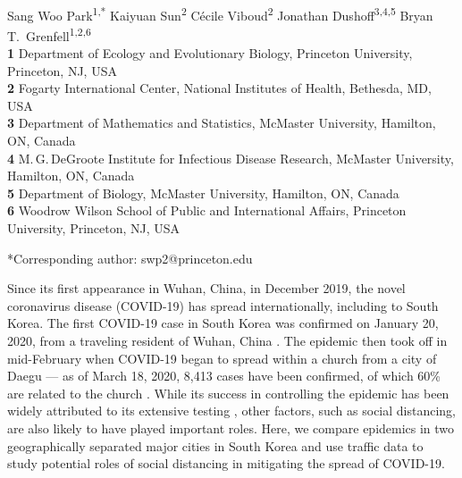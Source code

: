 \documentclass[12pt]{article}
\date{\today}
\begin{document}
\begin{flushleft}{
	\Large
	\textbf{}
}
\newline
\\
Sang Woo Park\textsuperscript{1,*}
Kaiyuan Sun\textsuperscript{2}
C\'ecile Viboud\textsuperscript{2}
Jonathan Dushoff\textsuperscript{3,4,5}
Bryan T.\ Grenfell\textsuperscript{1,2,6}
\\
\bigskip
\textbf{1} Department of Ecology and Evolutionary Biology, Princeton University, Princeton, NJ, USA
\\
\textbf{2} Fogarty International Center, National Institutes of Health, Bethesda, MD, USA
\\
\textbf{3} Department of Mathematics and Statistics, McMaster University, Hamilton, ON, Canada
\\
\textbf{4} M.\,G.\,DeGroote Institute for Infectious Disease Research, McMaster University, Hamilton, ON, Canada
\\
\textbf{5} Department of Biology, McMaster University, Hamilton, ON, Canada
\\
\textbf{6} Woodrow Wilson School of Public and International Affairs, Princeton University, Princeton, NJ, USA
\\
\bigskip

*Corresponding author: swp2@princeton.edu
\end{flushleft}

\pagebreak

Since its first appearance in Wuhan, China, in December 2019, the novel coronavirus disease (COVID-19) has spread internationally, including to South Korea.
The first COVID-19 case in South Korea was confirmed on January 20, 2020, from a traveling resident of Wuhan, China \citep{kcdc}.
The epidemic then took off in mid-February when COVID-19 began to spread within a church from a city of Daegu --- as of March 18, 2020, 8,413 cases have been confirmed, of which 60\% are related to the church \citep{kcdc}.
While its success in controlling the epidemic has been widely attributed to its extensive testing \citep{science}, other factors, such as social distancing, are also likely to have played important roles.
Here, we compare epidemics in two geographically separated major cities in South Korea and use traffic data to study potential roles of social distancing in mitigating the spread of COVID-19.
\end{document}
